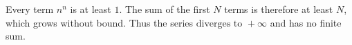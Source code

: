 Every term $n^n$ is at least $1$. The sum of the first $N$ terms is therefore at least $N$, which grows without bound. Thus the series $\boxed{\text{diverges to }+\infty}$ and has no finite sum.
